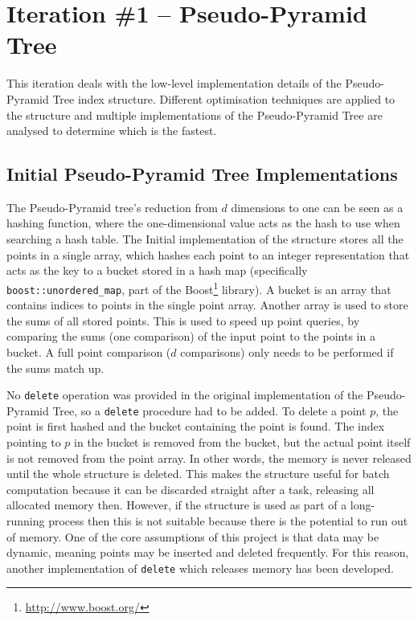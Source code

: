 \section{Iteration \#1 -- Pseudo-Pyramid Tree}

This iteration deals with the low-level implementation details of the Pseudo-Pyramid Tree index structure. Different optimisation techniques are applied to the structure and multiple implementations of the Pseudo-Pyramid Tree are analysed to determine which is the fastest.

\subsection{Initial Pseudo-Pyramid Tree Implementations}

The Pseudo-Pyramid tree's reduction from $d$ dimensions to one can be seen as a hashing function, where the one-dimensional value acts as the hash to use when searching a hash table. The Initial implementation of the structure stores all the points in a single array, which hashes each point to an integer representation that acts as the key to a bucket stored in a hash map (specifically \texttt{boost::unordered\_map}, part of the Boost\footnote{\url{http://www.boost.org/}} library). A bucket is an array that contains indices to points in the single point array. Another array is used to store the sums of all stored points. This is used to speed up point queries, by comparing the sums (one comparison) of the input point to the points in a bucket. A full point comparison ($d$ comparisons) only needs to be performed if the sums match up.

No \texttt{delete} operation was provided in the original implementation of the Pseudo-Pyramid Tree, so a \texttt{delete} procedure had to be added. To delete a point $p$, the point is first hashed and the bucket containing the point is found. The index pointing to $p$ in the bucket is removed from the bucket, but the actual point itself is not removed from the point array. In other words, the memory is never released until the whole structure is deleted. This makes the structure useful for batch computation because it can be discarded straight after a task, releasing all allocated memory then. However, if the structure is used as part of a long-running process then this is not suitable because there is the potential to run out of memory.  One of the core assumptions of this project is that data may be dynamic, meaning points may be inserted and deleted frequently. For this reason, another implementation of \texttt{delete} which releases memory has been developed.

